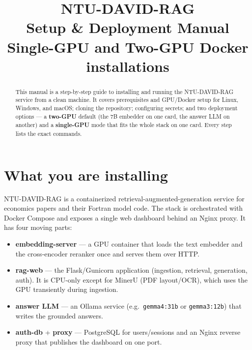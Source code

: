 \documentclass[11pt,a4paper]{article}
\title{\vspace{-1.2cm}\textbf{\color{accent}NTU-DAVID-RAG}\\[2pt]
       \large Setup \& Deployment Manual\\[4pt]
       \normalsize Single-GPU and Two-GPU Docker installations}
\author{}
\date{}
\newcommand{\code}[1]{\texttt{\small #1}}
\begin{document}
\maketitle
\vspace{-0.8cm}

\begin{abstract}
\noindent
This manual is a step-by-step guide to installing and running the
NTU-DAVID-RAG service from a clean machine. It covers prerequisites and
GPU/Docker setup for Linux, Windows, and macOS; cloning the repository;
configuring secrets; and two deployment options --- a \textbf{two-GPU}
default (the 7B embedder on one card, the answer LLM on another) and a
\textbf{single-GPU} mode that fits the whole stack on one card. Every step
lists the exact commands.
\end{abstract}

\tableofcontents
\vspace{0.4cm}

\section{What you are installing}
NTU-DAVID-RAG is a containerized retrieval-augmented-generation service for
economics papers and their Fortran model code. The stack is orchestrated with
Docker Compose and exposes a single web dashboard behind an Nginx proxy. It has
four moving parts:

\begin{itemize}[leftmargin=1.4em,itemsep=2pt]
  \item \textbf{embedding-server} --- a GPU container that loads the text
        embedder and the cross-encoder reranker once and serves them over HTTP.
  \item \textbf{rag-web} --- the Flask/Gunicorn application (ingestion,
        retrieval, generation, auth). It is CPU-only except for MinerU (PDF
        layout/OCR), which uses the GPU transiently during ingestion.
  \item \textbf{answer LLM} --- an Ollama service (e.g.\ \code{gemma4:31b} or
        \code{gemma3:12b}) that writes the grounded answers.
  \item \textbf{auth-db} + \textbf{proxy} --- PostgreSQL for users/sessions and
        an Nginx reverse proxy that publishes the dashboard on one port.
\end{itemize}
\end{document}
